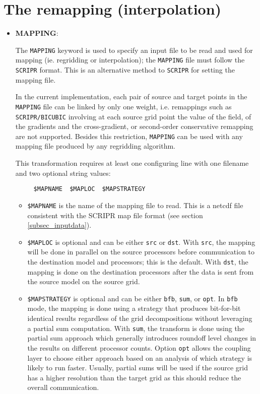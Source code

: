 
\section{The remapping (interpolation)}
\label{subsec_interp}

\begin{itemize}

\item {\bf MAPPING}: 

  The {\tt MAPPING} keyword is used to specify an input file to be
  read and used for mapping (ie. regridding or interpolation); the {\tt MAPPING} file must follow the {\tt SCRIPR} format. 
  This is an alternative method to {\tt SCRIPR} for setting the mapping file.
 
  In the current implementation, each pair of source and target points
  in the {\tt MAPPING} file can be linked by only one weight,
  i.e. remappings such as {\tt SCRIPR/BICUBIC} involving at each
  source grid point the value of the field, of the gradients and the
  cross-gradient, or second-order conservative remapping are not
  supported. Besides this restriction, {\tt MAPPING} can be used with
  any mapping file produced by any regridding algorithm.   

This transformation requires at least one configuring line with one
filename and two optional string values:
\begin{verbatim}
     $MAPNAME  $MAPLOC  $MAPSTRATEGY
\end{verbatim}
  \begin{itemize}
  \item {\tt \$MAPNAME} is the name of the mapping file to read.  This
    is a netcdf file consistent with the SCRIPR map file format (see section
  \ref{subsec_inputdata}).

  \item {\tt \$MAPLOC} is optional and can be either {\tt src} or {\tt dst}.  With {\tt src}, the mapping will be done
  in parallel on the source processors before communication to the destination model and processors; this is the default.   With {\tt dst}, the mapping is 
  done on the destination processors after the data is sent from the source
  model on the source grid. 

  \item {\tt \$MAPSTRATEGY} is optional and can be either {\tt bfb}, {\tt sum}, or {\tt opt}.  In {\tt bfb} mode, the mapping is
  done using a strategy that produces bit-for-bit identical results regardless
  of the grid decompositions without leveraging a partial sum computation.  With
  {\tt sum}, the transform is done using the partial sum approach which generally
  introduces roundoff level changes in the results on different processor
  counts. Option {\tt opt} allows the coupling layer to choose either
  approach based on an analysis of which strategy is likely to run
  faster. Usually, partial sums will be used if the source grid has a higher resolution
  than the target grid as this should reduce the overall
  communication. 


\end{itemize}
\end{itemize}
